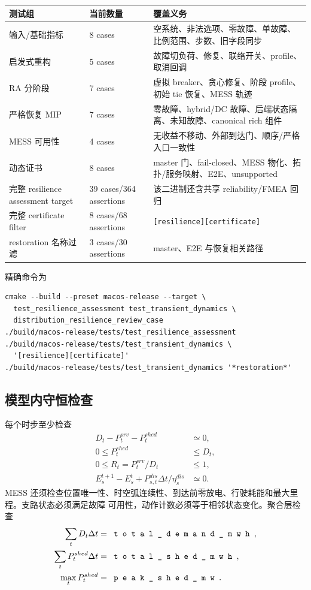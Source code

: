 \begin{center}\small
\begin{longtable}{@{}L{4.0cm}L{3.0cm}L{6.2cm}@{}}
\toprule
测试组 & 当前数量 & 覆盖义务\\\midrule\endhead
输入/基础指标 & 8 cases & 空系统、非法选项、零故障、单故障、比例范围、步数、旧字段同步\\
启发式重构 & 5 cases & 故障切负荷、修复、联络开关、profile、取消回调\\
RA 分阶段 & 7 cases & 虚拟 breaker、贪心修复、阶段 profile、初始 tie 恢复、MESS 轨迹\\
严格恢复 MIP & 7 cases & 零故障、hybrid/DC 故障、后端状态隔离、未知故障、canonical rich 组件\\
MESS 可用性 & 4 cases & 无收益不移动、外部到达门、顺序/严格入口一致性\\
动态证书 & 8 cases & master 门、fail-closed、MESS 物化、拓扑/服务映射、E2E、unsupported\\
完整 resilience assessment target & 39 cases/364 assertions & 该二进制还含共享 reliability/FMEA 回归\\
完整 certificate filter & 8 cases/68 assertions & \texttt{[resilience][certificate]}\\
restoration 名称过滤 & 3 cases/30 assertions & master、E2E 与恢复相关路径\\
\bottomrule
\end{longtable}
\end{center}

精确命令为
\begin{verbatim}
cmake --build --preset macos-release --target \
  test_resilience_assessment test_transient_dynamics \
  distribution_resilience_review_case
./build/macos-release/tests/test_resilience_assessment
./build/macos-release/tests/test_transient_dynamics \
  '[resilience][certificate]'
./build/macos-release/tests/test_transient_dynamics '*restoration*'
\end{verbatim}

\subsection{模型内守恒检查}

每个时步至少检查
\begin{align}
 D_t-P_t^{srv}-P_t^{shed}&\simeq0,\\
 0\le P_t^{shed}&\le D_t,\\
 0\le R_t=P_t^{srv}/D_t&\le1,\\
 E_s^{t+1}-E_s^t+P_{s,t}^{dis}\Delta t/\eta_s^{dis}&\simeq0.
\end{align}
MESS 还须检查位置唯一性、时空弧连续性、到达前零放电、行驶耗能和最大里程。支路状态必须满足故障
可用性，动作计数必须等于相邻状态变化。聚合层检查
\begin{align}
 \sum_tD_t\Delta t&=\fld{total\_demand\_mwh},\\
 \sum_tP_t^{shed}\Delta t&=\fld{total\_shed\_mwh},\\
 \max_tP_t^{shed}&=\fld{peak\_shed\_mw}.
\end{align}

